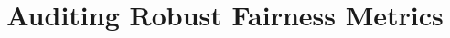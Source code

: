 \documentclass[10pt]{article}
\begin{document}
\date{}
\title{\Large \bf Auditing Robust Fairness Metrics}
\author{}
\maketitle

\thispagestyle{empty}

%
%



\end{document}
